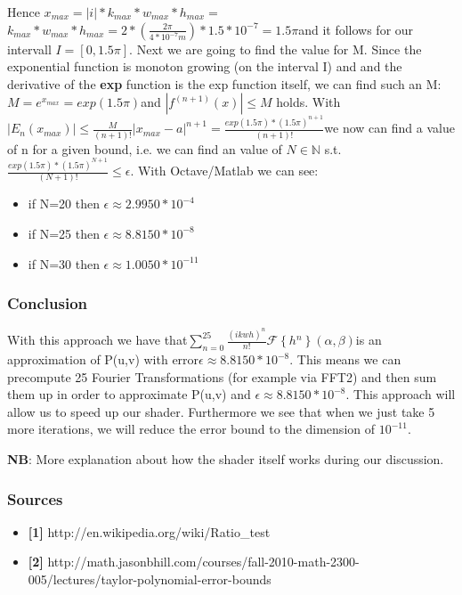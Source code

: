 Hence $x_{max}=|i|*k_{max}*w_{max}*h_{max}=$$k_{max}*w_{max}*h_{max}=2*(\frac{2\pi}{4*10^{-7}m})*1.5*10^{-7}=1.5\pi$and
it follows for our intervall $I=[0,1.5\pi]$. Next we are going to
find the value for M. Since the exponential function is monoton growing
(on the interval I) and and the derivative of the \textbf{exp} function
is the exp function itself, we can find such an M: $M=e^{x_{max}}=exp(1.5\pi)$and
$|f^{(n+1)}(x)|\leq M$ holds. With $|E_{n}(x_{max})|\leq\frac{M}{(n+1)!}|x_{max}-a|^{n+1}=\frac{exp(1.5\pi)*(1.5\pi)^{n+1}}{(n+1)!}$we
now can find a value of n for a given bound, i.e. we can find an value
of $N\mathbb{\in N}$ s.t. $\frac{exp(1.5\pi)*(1.5\pi)^{N+1}}{(N+1)!}\leq\epsilon$.
With Octave/Matlab we can see: 
\begin{itemize}
\item if N=20 then $\epsilon\approx2.9950*10^{-4}$
\item if N=25 then $\epsilon\approx8.8150*10^{-8}$
\item if N=30 then $\epsilon\approx1.0050*10^{-11}$
\end{itemize}

\subsubsection{Conclusion}

With this approach we have that$\sum_{n=0}^{25}\frac{(ikwh)^{n}}{n!}\mathcal{F}\left\{ h{}^{n}\right\} (\alpha,\beta)$is
an approximation of P(u,v) with error$\epsilon\approx8.8150*10^{-8}$.
This means we can precompute 25 Fourier Transformations (for example
via FFT2) and then sum them up in order to approximate P(u,v) and
$\epsilon\approx8.8150*10^{-8}$. This approach will allow us to speed
up our shader. Furthermore we see that when we just take 5 more iterations,
we will reduce the error bound to the dimension of $10^{-11}$.

\textbf{NB}: More explanation about how the shader itself works during
our discussion.


\subsubsection{Sources}
\begin{itemize}
\item \textbf{{[}1{]}} http://en.wikipedia.org/wiki/Ratio\_test
\item \textbf{{[}2{]}} http://math.jasonbhill.com/courses/fall-2010-math-2300-005/lectures/taylor-polynomial-error-bounds\end{itemize}





